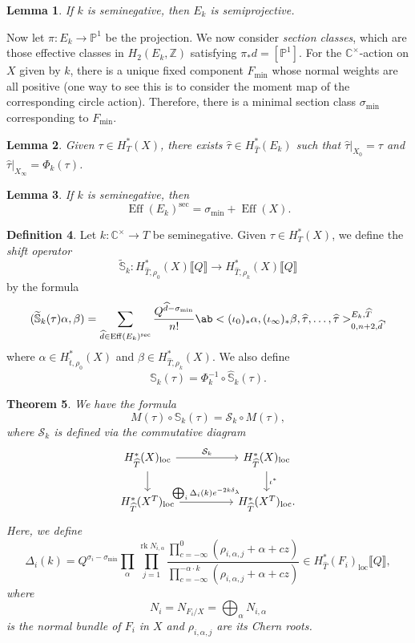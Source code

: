 \documentclass[leqno, openany]{memoir}
\newtheorem{thm}{Theorem}[section]
\newtheorem{lem}[thm]{Lemma}
\theoremstyle{definition}
\newtheorem{defn}[thm]{Definition}
\theoremstyle{remark}
\theoremstyle{plain}
\theoremstyle{definition}
\theoremstyle{remark}
\newcommand{\C}{\mathbb{C}}
\newcommand{\Z}{\mathbb{Z}}
\newcommand{\bS}{\mathbb{S}}
\renewcommand{\P}{\mathbb{P}}
\newcommand{\mc}[1]{\mathcal{#1}}
\newcommand{\mr}[1]{\mathrm{#1}}
\newcommand{\on}[1]{\operatorname{#1}}
\newcommand{\wt}[1]{\widetilde{#1}}
\newcommand{\wh}[1]{\widehat{#1}}
\begin{document}
\begin{lem}
    If $k$ is seminegative, then $E_k$ is semiprojective.
\end{lem}

Now let $\pi \colon E_k \to \P^1$ be the projection. We now consider \textit{section classes}, which are those effective classes in $H_2(E_k, \Z)$ satisfying $\pi_* d = [\P^1]$. For the $\C^{\times}$-action on $X$ given by $k$, there is a unique fixed component $F_{\mr{min}}$ whose normal weights are all positive (one way to see this is to consider the moment map of the corresponding circle action). Therefore, there is a minimal section class $\sigma_{\min}$ corresponding to $F_{\min}$.

\begin{lem}
    Given $\tau \in H_T^*(X)$, there exists $\wh{\tau} \in H_{\wh{T}}^*(E_k)$ such that $\wh{\tau}|_{X_0} = \tau$ and $\wh{\tau}|_{X_{\infty}} = \Phi_k(\tau)$.
\end{lem}


\begin{lem}
    If $k$ is seminegative, then
    \[ \on{Eff}(E_k)^{\mr{sec}} = \sigma_{\min} + \on{Eff}(X). \]
\end{lem}

\begin{defn}
    Let $k \colon \C^{\times} \to T$ be seminegative. Given $\tau \in H_T^*(X)$, we define the \textit{shift operator} 
    \[ \wt{\mathbb{S}}_k \colon H_{\wh{T}, \rho_0}^*(X) \llbracket Q \rrbracket \to H_{\wh{T}, \rho_k}^*(X) \llbracket Q \rrbracket \] 
    by the formula
    \[ (\wt{\mathbb{S}}_k(\tau) \alpha, \beta) = \sum_{\wh{d} \in \on{Eff}(E_k)^{\mr{sec}}} \frac{Q^{\wh{d} - \sigma_{\min}}}{n!} \ab< (\iota_0)_* \alpha, (\iota_{\infty})_* \beta, \wh{\tau}, \ldots, \wh{\tau}>_{0,n+2,\wh{d}}^{E_k, \wh{T}}, \]
    where $\alpha \in H_{\wh{t}, \rho_0}^*(X)$ and $\beta \in H_{\wh{T}, \rho_k}^*(X)$. We also define
    \[ \bS_k(\tau) = \Phi_k^{-1} \circ \wh{\bS}_k(\tau). \]
\end{defn}

\begin{thm}
    We have the formula
    \[ M(\tau) \circ \bS_k(\tau) = \mc{S}_k \circ M(\tau), \]
    where $\mc{S}_k$ is defined via the commutative diagram
    \begin{equation*}
    \begin{tikzcd}
        H_{\wh{T}}^*(X)_{\mr{loc}} \ar{rr}{\mc{S}_k} \ar{d} & & H_{\wh{T}}^*(X)_{\mr{loc}} \ar{d}{\iota^*} \\
        H_{\wh{T}}^*(X^T)_{\mr{loc}} \ar{rr}{\bigoplus_i \Delta_i(k) e^{-2k\delta_{\lambda}}} & & H_{\wh{T}}^*(X^T)_{\mr{loc}}.
    \end{tikzcd}
    \end{equation*}
    Here, we define
    \[ \Delta_i(k) = Q^{\sigma_i - \sigma_{\min}} \prod_{\alpha} \prod_{j=1}^{\on{rk} N_{i,\alpha}} \frac{\prod_{c=-\infty}^0 (\rho_{i,\alpha,j} + \alpha + cz)}{\prod_{c=-\infty}^{-\alpha \cdot k} (\rho_{i,\alpha,j} + \alpha + cz)} \in H_{\wh{T}}^*(F_i)_{\mr{loc}} \llbracket Q \rrbracket, \]
    where 
    \[ N_i = N_{F_i/X} = \bigoplus_{\alpha} N_{i,\alpha} \]
    is the normal bundle of $F_i$ in $X$ and $\rho_{i,\alpha,j}$ are its Chern roots.
\end{thm}
\end{document}
